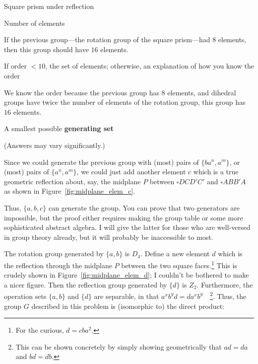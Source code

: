 \documentclass[../gatm_answers.tex]{subfiles}
\begin{document}
\begin{outer_problem}
\item Square prism under reflection
\end{outer_problem}

\begin{inner_problem}[start=1]
\item Number of elements
\end{inner_problem}

\noindent If the previous group---the rotation group of the square prism---had $8$ elements, then this group should have $16$ elements.

\begin{inner_problem}
\item If order $< 10$, the set of elements; otherwise, an explanation of how you know the order
\end{inner_problem}

\noindent We know the order because the previous group has $8$ elements, and dihedral groups have twice the number of elements of the rotation group, this group has $16$ elements.

\begin{inner_problem}
\item A smallest possible \textbf{generating set}
\end{inner_problem}

\noindent(Answers may vary significantly.)

Since we could generate the previous group with (most) pairs of $\{ba^n,a^m\}$, or (most) pairs of $\{a^n,a^m\}$, we could just add another element $c$ which is a true geometric reflection about, say, the midplane $P$ between $\square DCD'C'$ and $\square ABB'A$ as shown in Figure~\ref{fig:midplane_elem_c}.

Thus, $\{a,b,c\}$ can generate the group. You can prove that two generators are impossible, but the proof either requires making the group table or some more sophisticated abstract algebra. I will give the latter for those who are well-versed in group theory already, but it will probably be inaccessible to most.

The rotation group generated by $\{a,b\}$ is $D_4$. Define a new element $d$ which is the reflection through the midplane $P$ between the two square faces.\footnote{For the curious, $d=cba^2$.} This is crudely shown in Figure~\ref{fig:midplane_elem_d}; I couldn't be bothered to make a nicer figure. Then the reflection group generated by $\{d\}$ is $Z_2$. Furthermore, the operation sets $\{a,b\}$ and $\{d\}$ are separable, in that $a^xb^yd=da^xb^y\quad$\footnote{This can be shown concretely by simply showing geometrically that $ad=da$ and $bd=db$.}. Thus, the group $G$ described in this problem is (isomorphic to) the direct product:
\end{document}
